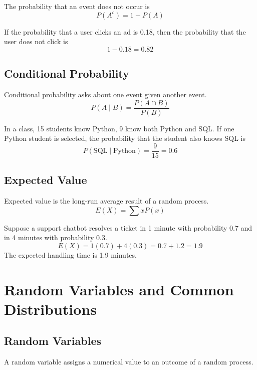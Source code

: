 \documentclass[11pt,a4paper]{article}
\begin{document}
The probability that an event does not occur is
\[
P(A^c) = 1 - P(A)
\]

\begin{examplebox}
If the probability that a user clicks an ad is 0.18, then the probability that the user does not click is
\[
1 - 0.18 = 0.82
\]
\end{examplebox}

\subsection{Conditional Probability}

Conditional probability asks about one event given another event.
\[
P(A \mid B) = \frac{P(A \cap B)}{P(B)}
\]

\begin{examplebox}
In a class, 15 students know Python, 9 know both Python and SQL. If one Python student is selected, the probability that the student also knows SQL is
\[
P(\text{SQL} \mid \text{Python}) = \frac{9}{15} = 0.6
\]
\end{examplebox}

\subsection{Expected Value}

Expected value is the long-run average result of a random process.
\[
E(X) = \sum xP(x)
\]

\begin{examplebox}
Suppose a support chatbot resolves a ticket in 1 minute with probability 0.7 and in 4 minutes with probability 0.3.
\[
E(X) = 1(0.7) + 4(0.3) = 0.7 + 1.2 = 1.9
\]
The expected handling time is 1.9 minutes.
\end{examplebox}

\section{Random Variables and Common Distributions}

\subsection{Random Variables}

A random variable assigns a numerical value to an outcome of a random process.
\end{document}
